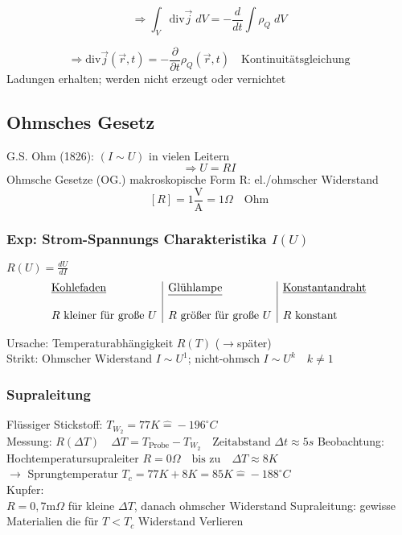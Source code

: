 \documentclass[titlepage,12pt,a4paper,ngerman]{report}
\newcommand{\tx}[1]{\textrm{#1}}
\begin{document}


$$\Rightarrow \int_V \tx{div} \vec{j} \;dV = - \frac{d}{dt} \int \rho_Q \;dV$$

$$\Rightarrow \boxed{\tx{div} \vec{j}(\vec{r},t) = -\frac{\partial}{\partial t} \rho_Q (\vec{r},t)}\quad \tx{Kontinuitätsgleichung}$$
Ladungen erhalten; werden nicht erzeugt oder vernichtet
\subsection{Ohmsches Gesetz}
G.S. Ohm (1826): $(I \sim U)$ in vielen Leitern
$$\Rightarrow \boxed{U = R I}$$
Ohmsche Gesetze (OG.) makroskopische Form
R: el./ohmscher Widerstand $$[R] = 1 \frac{\tx{V}}{\tx{A}} = 1 \Omega \quad \tx{Ohm}$$

\subsubsection{Exp: Strom-Spannungs Charakteristika $I(U)$}
$R(U) = \frac{dU}{dI}$\\

$$\begin{array}{l|l|l}
\tx{\underline{Kohlefaden}} & \tx{\underline{Glühlampe}} & \tx{\underline{Konstantandraht}}\\
&&\\
R \tx{ kleiner für große } U & R \tx{ größer für große } U & R \tx{ konstant} \\
\end{array}$$

Ursache: Temperaturabhängigkeit $R(T)$ ($\rightarrow
$später)\\
Strikt: Ohmscher Widerstand $I\sim U^1$; nicht-ohmsch $I\sim U^k \quad k \neq 1$
\subsubsection{Supraleitung}

Flüssiger Stickstoff: $T_{W_2} = 77K \widehat{=} - 196^\circ C$\\
Messung: $R(\Delta T) \quad \Delta T = T_{\tx{Probe}} - T_{W_2} \quad \tx{Zeitabstand } \Delta t \approx 5s$
Beobachtung:\\
Hochtemperatursupraleiter $R = 0\Omega \quad \tx{bis zu} \quad \Delta T \approx 8 K$\\
$\rightarrow $ Sprungtemperatur $T_c = 77K + 8 K = 85 K \widehat{=} -188^\circ C$\\
Kupfer:\\
$R = 0,7 \tx{m}\Omega$ für kleine $\Delta T$, danach ohmscher Widerstand
Supraleitung: gewisse Materialien die für $T<T_c$ Widerstand Verlieren
\end{document}
